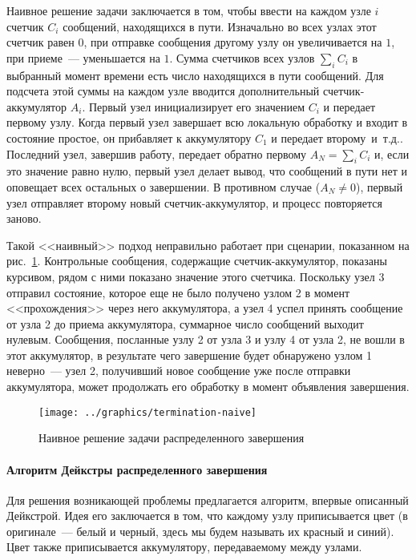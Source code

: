 \documentclass[12pt,a4paper,fleqn]{article}
\newcommand\etc{~и~т.д.}
\begin{document}
Наивное решение задачи заключается в том, чтобы ввести на каждом узле $i$ счетчик $C_i$
сообщений, находящихся в пути. Изначально во всех узлах этот счетчик равен $0$, при
отправке сообщения другому узлу он увеличивается на $1$, при приеме~--- уменьшается на
$1$. Сумма счетчиков всех узлов $\sum_iC_i$ в выбранный момент времени есть число
находящихся в пути сообщений. Для подсчета этой суммы на каждом узле вводится
дополнительный счетчик-аккумулятор $A_i$. Первый узел инициализирует его значением $C_i$ и
передает первому узлу. Когда первый узел завершает всю локальную обработку и входит в
состояние простое, он прибавляет к аккумулятору $C_1$ и передает второму\etc. Последний
узел, завершив работу, передает обратно первому $A_N = \sum_iC_i$ и, если это значение
равно нулю, первый узел делает вывод, что сообщений в пути нет и оповещает всех остальных
о завершении. В противном случае ($A_N \neq 0$), первый узел отправляет второму новый
счетчик-аккумулятор, и процесс повторяется заново.

Такой <<наивный>> подход неправильно работает при сценарии, показанном на
рис.~\ref{fig:termination-naive}. Контрольные сообщения, содержащие счетчик-аккумулятор, показаны
курсивом, рядом с ними показано значение этого счетчика. Поскольку узел 3 отправил состояние,
которое еще не было получено узлом 2 в момент <<прохождения>> через него аккумулятора, а узел 4
успел принять сообщение от узла 2 до приема аккумулятора, суммарное число сообщений выходит
нулевым. Сообщения, посланные узлу 2 от узла 3 и узлу 4 от узла 2, не вошли в этот аккумулятор, в
результате чего завершение будет обнаружено узлом 1 неверно~--- узел 2, получивший новое сообщение
уже после отправки аккумулятора, может продолжать его обработку в момент объявления завершения.

\begin{figure}[htb]
  \centering
  \texttt{[image: ../graphics/termination-naive]}  
  \caption{Наивное решение задачи распределенного завершения}
\label{fig:termination-naive}
\end{figure}

\paragraph{Алгоритм Дейкстры распределенного завершения}

Для решения возникающей проблемы предлагается алгоритм, впервые описанный Дейкстрой. Идея
его заключается в том, что каждому узлу приписывается цвет (в оригинале~--- белый и
черный, здесь мы будем называть их красный и синий). Цвет также приписывается
аккумулятору, передаваемому между узлами.
\end{document}

